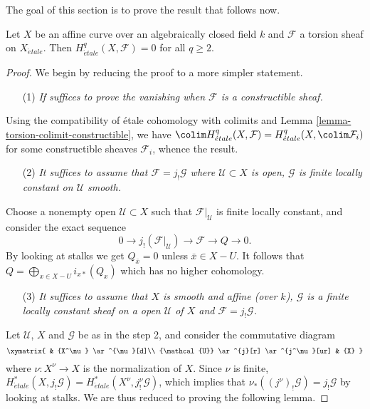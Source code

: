 \noindent
The goal of this section is to prove the result that follows now.

\begin{theorem}
\label{theorem-vanishing-affine-curves}
Let $X$ be an affine curve over an algebraically closed field $k$ and
$\mathcal{F}$ a torsion sheaf on $X_{\acute{e}tale}$. Then
$H_{\acute{e}tale}^q(X, \mathcal{F}) = 0$ for all $q\geq 2$.
\end{theorem}

\begin{proof}
We begin by reducing the proof to a more simpler statement.
\begin{enumerate}
\item[(1)] {\it If suffices to prove the vanishing when $\mathcal{F}$
is a constructible sheaf.}
\end{enumerate}

\noindent
Using the compatibility of \'etale cohomology with colimits and
Lemma \ref{lemma-torsion-colimit-constructible},
we have $\colim H_{\acute{e}tale}^q(X, \mathcal{F}) =
H_{\acute{e}tale}^q(X, \colim \mathcal{F}_i)$ for some
constructible sheaves $\mathcal{F}_i$, whence the result.

\begin{enumerate}
\item[(2)]
{\it It suffices to assume that $\mathcal{F} = j_!\mathcal{G}$ where
$\mathcal{U}\subset X$ is open, $\mathcal{G}$ is finite locally constant on
$\mathcal{U}$ smooth.}
\end{enumerate}

\noindent
Choose a nonempty open $\mathcal{U}\subset X$ such that
$\mathcal{F}|_\mathcal{U}$ is finite locally constant, and consider the exact
sequence
$$
0\to j_!(\mathcal{F}|_\mathcal{U})\to \mathcal{F}\to Q\to 0.
$$
By looking at stalks we get $Q_{\bar x}=0$ unless $\bar x\in X-U$. It follows
that $\displaystyle Q = \bigoplus_{x\in X-U} i_{x*} (Q_x)$
which has no higher cohomology.

\begin{enumerate}
\item[(3)]
{\it It suffices to assume that $X$ is smooth and affine (over $k$),
$\mathcal{G}$ is a finite locally constant sheaf on a open $\mathcal{U}$ of $X$
and $\mathcal{F} = j_!\mathcal{G}$.}
\end{enumerate}

\noindent
Let $\mathcal{U}$, $X$ and $\mathcal{G}$ be as in the step 2, and consider the
commutative diagram
$$
\xymatrix{
& {X^\nu} \ar^{\nu}[d]\\
{\mathcal{U}} \ar^{j}[r] \ar^{j^\nu}[ur] & {X}
}
$$
where $\nu: X^\nu \to X$ is the normalization of $X$. Since $\nu$ is finite,
$H_{\acute{e}tale}^*(X, j_!\mathcal{G}) =
H_{\acute{e}tale}^*(X^\nu, j^\nu_!\mathcal{G})$, which
implies that $\nu_*((j^\nu)_!\mathcal{G}) = j_!\mathcal{G}$ by looking at
stalks. We are thus reduced to proving the following lemma.
\end{proof}

